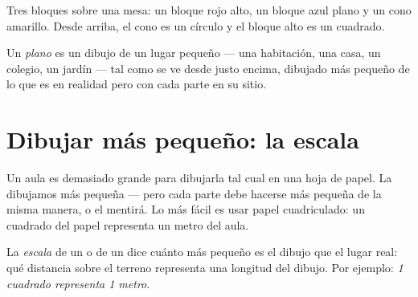 \begin{omfigure}

{\small Tres bloques sobre una mesa: un bloque rojo alto, un bloque azul
plano y un cono amarillo. Desde arriba, el cono es un círculo y el bloque
alto es un cuadrado.}
\label{fig:g2:drawing-to-map:blocks}
\end{omfigure}

\begin{definition}[Plano]\label{def:g2:drawing-to-map:plan}
Un \emph{plano} es un dibujo de un lugar pequeño --- una
habitación, una casa, un colegio, un jardín --- tal como se ve desde justo
encima, dibujado más pequeño de lo que es en realidad pero con cada parte en
su sitio.
\end{definition}

\section{Dibujar más pequeño: la escala}

Un aula es demasiado grande para dibujarla tal cual en una hoja de papel. La
dibujamos más pequeña --- pero cada parte debe hacerse más pequeña de la
misma manera, o el  mentirá. Lo más fácil es usar papel
cuadriculado: un cuadrado del papel representa un metro del aula.

\begin{definition}[Escala]\label{def:g2:drawing-to-map:scale}
La \emph{escala} de un  o de un  dice cuánto más
pequeño es el dibujo que el lugar real: qué distancia sobre el terreno
representa una longitud del dibujo. Por ejemplo: \emph{1 cuadrado representa
1 metro}.
\end{definition}


